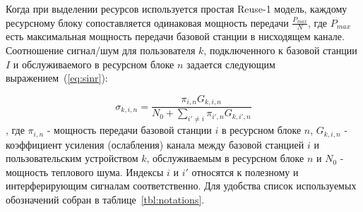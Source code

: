 Когда при выделении ресурсов используется простая Reuse-1 модель,  каждому ресурсному блоку сопоставляется одинаковая мощность передачи $\frac{P_{max}}{N}$,  где $P_{max}$ есть максимальная мощность передачи базовой станции в  нисходящем канале. Соотношение сигнал/шум для пользователя $k$,  подключенного к базовой станции $I$ и обслуживаемого в ресурсном блоке $n$ задается следующим выражением~(\ref{eq:sinr}):

\begin{equation}
    \label{eq:sinr}
    \sigma_{k,i,n} = \frac{\pi_{i,n} G_{k,i,n}}{N_0 + \sum_{i'\neq i}{\pi_{i',n} G_{k,i',n}}}
\end{equation}
, где $\pi_{i,n}$ - мощность передачи базовой станции $i$ в ресурсном блоке $n$, $G_{k,i,n}$ - коэффициент усиления (ослабления) канала между базовой станцией $i$ и пользовательским устройством $k$, обслуживаемым в ресурсном блоке $n$ и $N_0$ - мощность теплового шума. Индексы $i$ и $i'$ относятся к полезному и интерферирующим сигналам соответственно. Для удобства список используемых обозначений собран в таблице~\ref{tbl:notations}.


